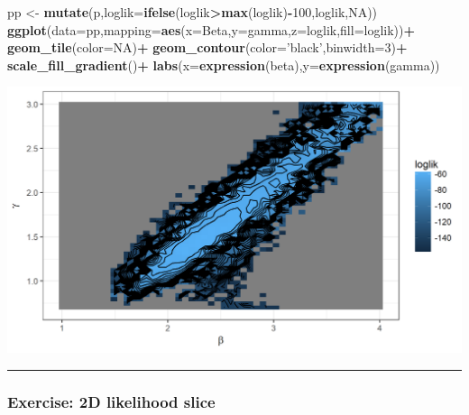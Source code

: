 \documentclass[]{article}
\newenvironment{Shaded}{\begin{snugshade}}{\end{snugshade}}
\newcommand{\KeywordTok}[1]{\textcolor[rgb]{0.13,0.29,0.53}{\textbf{#1}}}
\newcommand{\DataTypeTok}[1]{\textcolor[rgb]{0.13,0.29,0.53}{#1}}
\newcommand{\DecValTok}[1]{\textcolor[rgb]{0.00,0.00,0.81}{#1}}
\newcommand{\StringTok}[1]{\textcolor[rgb]{0.31,0.60,0.02}{#1}}
\newcommand{\OtherTok}[1]{\textcolor[rgb]{0.56,0.35,0.01}{#1}}
\newcommand{\OperatorTok}[1]{\textcolor[rgb]{0.81,0.36,0.00}{\textbf{#1}}}
\newcommand{\NormalTok}[1]{#1}
\begin{document}
\begin{Shaded}
\begin{Highlighting}[]
\NormalTok{pp <-}\StringTok{ }\KeywordTok{mutate}\NormalTok{(p,}\DataTypeTok{loglik=}\KeywordTok{ifelse}\NormalTok{(loglik}\OperatorTok{>}\KeywordTok{max}\NormalTok{(loglik)}\OperatorTok{-}\DecValTok{100}\NormalTok{,loglik,}\OtherTok{NA}\NormalTok{))}
\KeywordTok{ggplot}\NormalTok{(}\DataTypeTok{data=}\NormalTok{pp,}\DataTypeTok{mapping=}\KeywordTok{aes}\NormalTok{(}\DataTypeTok{x=}\NormalTok{Beta,}\DataTypeTok{y=}\NormalTok{gamma,}\DataTypeTok{z=}\NormalTok{loglik,}\DataTypeTok{fill=}\NormalTok{loglik))}\OperatorTok{+}
\StringTok{  }\KeywordTok{geom_tile}\NormalTok{(}\DataTypeTok{color=}\OtherTok{NA}\NormalTok{)}\OperatorTok{+}
\StringTok{  }\KeywordTok{geom_contour}\NormalTok{(}\DataTypeTok{color=}\StringTok{'black'}\NormalTok{,}\DataTypeTok{binwidth=}\DecValTok{3}\NormalTok{)}\OperatorTok{+}
\StringTok{  }\KeywordTok{scale_fill_gradient}\NormalTok{()}\OperatorTok{+}
\StringTok{  }\KeywordTok{labs}\NormalTok{(}\DataTypeTok{x=}\KeywordTok{expression}\NormalTok{(beta),}\DataTypeTok{y=}\KeywordTok{expression}\NormalTok{(gamma))}
\end{Highlighting}
\end{Shaded}

\begin{center}\includegraphics{figure/notes12-sir-grid1-plot-1} \end{center}

\begin{center}\rule{0.5\linewidth}{\linethickness}\end{center}

\subsubsection{Exercise: 2D likelihood
slice}\label{exercise-2d-likelihood-slice}
\end{document}
